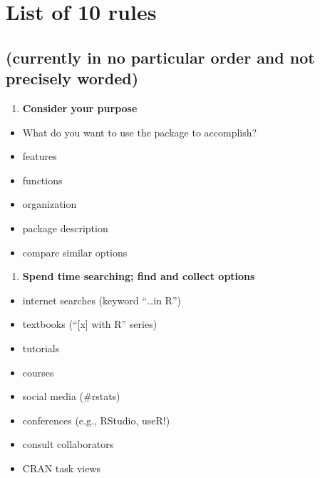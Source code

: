\documentclass[10pt,letterpaper]{article}
\providecommand{\tightlist}{%
  \setlength{\itemsep}{0pt}\setlength{\parskip}{0pt}}
\begin{document}
\hypertarget{list-of-10-rules}{%
\section{List of 10 rules}\label{list-of-10-rules}}

\hypertarget{currently-in-no-particular-order-and-not-precisely-worded}{%
\subsection{(currently in no particular order and not precisely
worded)}\label{currently-in-no-particular-order-and-not-precisely-worded}}

\begin{enumerate}
\def\labelenumi{\arabic{enumi}.}
\tightlist
\item
  \textbf{Consider your purpose}
\end{enumerate}

\begin{itemize}
\tightlist
\item
  What do you want to use the package to accomplish?
\item
  features
\item
  functions
\item
  organization
\item
  package description
\item
  compare similar options
\end{itemize}

\begin{enumerate}
\def\labelenumi{\arabic{enumi}.}
\setcounter{enumi}{1}
\tightlist
\item
  \textbf{Spend time searching; find and collect options}
\end{enumerate}

\begin{itemize}
\tightlist
\item
  internet searches (keyword ``\ldots in R'')
\item
  textbooks (``{[}x{]} with R'' series)
\item
  tutorials
\item
  courses
\item
  social media (\#rstats)
\item
  conferences (e.g., RStudio, useR!)
\item
  consult collaborators
\item
  CRAN task views
\end{itemize}
\end{document}
